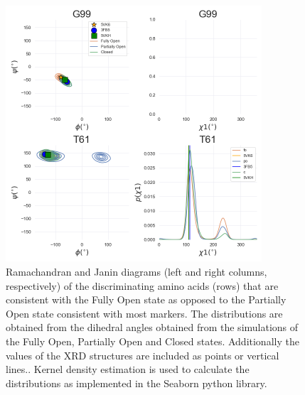 \documentclass[%
 aip,
 amsmath,amssymb,
 preprint,%
]{revtex4-1}
\begin{document}
\begin{figure}[tbp]
	\includegraphics[width=0.85\textwidth]{figures_SI/dihedral_analysis_SI.png}
	 \caption{\scriptsize
Ramachandran and Janin diagrams (left and right columns, respectively) of the discriminating amino acids (rows) that are consistent with the Fully Open state as opposed to the Partially Open state consistent with most markers. The distributions are obtained from the dihedral angles obtained from the simulations of the Fully Open, Partially Open and Closed states. Additionally the values of the XRD structures are included as points or vertical lines.. Kernel density estimation is used to calculate the distributions as implemented in the Seaborn python library. 
}
\label{SI_dihedral}
\end{figure}

\clearpage
\end{document}
